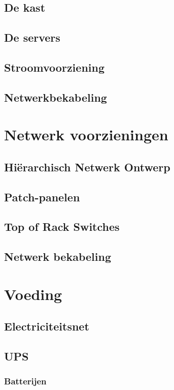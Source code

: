 \documentclass[a4paper,12pt,twoside,openright,titlepage]{book}
\begin{document}
\section{De kast}

\section{De servers}

\section{Stroomvoorziening}

\section{Netwerkbekabeling}


\chapter{Netwerk voorzieningen}
\section{Hi\"erarchisch Netwerk Ontwerp}

\section{Patch-panelen}

\section{Top of Rack Switches}

\section{Netwerk bekabeling}


\chapter{Voeding}

\section{Electriciteitsnet}

\section{UPS}

\subsection{Batterijen}

\end{document}
